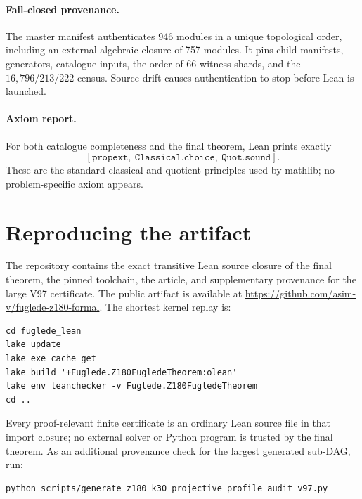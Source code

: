\documentclass[10pt,twocolumn]{article}
\theoremstyle{definition}
\theoremstyle{remark}
\begin{document}
\paragraph{Fail-closed provenance.}
The master manifest authenticates 946 modules in a unique topological order,
including an external algebraic closure of 757 modules.  It pins child
manifests, generators, catalogue inputs, the order of 66 witness shards, and
the $16{,}796/213/222$ census.  Source drift causes authentication to stop
before Lean is launched.

\paragraph{Axiom report.}
For both catalogue completeness and the final theorem, Lean prints exactly
\[
  [\texttt{propext},\ \texttt{Classical.choice},\ \texttt{Quot.sound}].
\]
These are the standard classical and quotient principles used by mathlib; no
problem-specific axiom appears.

\section{Reproducing the artifact}

The repository contains the exact transitive Lean source closure of the final
theorem, the pinned toolchain, the article, and supplementary provenance for
the large V97 certificate.  The public artifact is available at
\url{https://github.com/asim-v/fuglede-z180-formal}.  The shortest kernel
replay is:

\noindent\begin{minipage}{\dimexpr\columnwidth-2\fboxsep-2\fboxrule\relax}
\begin{lstlisting}[language={},basicstyle=\ttfamily\scriptsize]
cd fuglede_lean
lake update
lake exe cache get
lake build '+Fuglede.Z180FugledeTheorem:olean'
lake env leanchecker -v Fuglede.Z180FugledeTheorem
cd ..
\end{lstlisting}
\end{minipage}

Every proof-relevant finite certificate is an ordinary Lean source file in
that import closure; no external solver or Python program is trusted by the
final theorem.  As an additional provenance check for the largest generated
sub-DAG, run:

\begin{lstlisting}[language={},basicstyle=\ttfamily\scriptsize]
python scripts/generate_z180_k30_projective_profile_audit_v97.py
\end{lstlisting}
\end{document}
